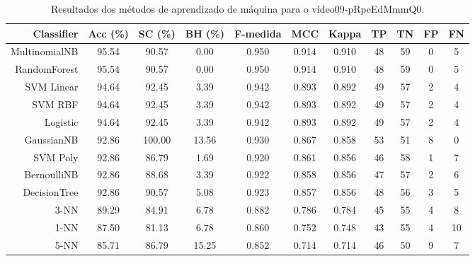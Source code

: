 \begin{table}[!htb]
\centering
\caption{Resultados dos métodos de aprendizado de máquina para o vídeo09-pRpeEdMmmQ0.}
\label{tab:09-pRpeEdMmmQ0}
\begin{tabular}{r|c|c|c|c|c|c|c|c|c|c}
\hline\hline
Classifier & Acc (\%) & SC (\%) & BH (\%) & F-medida & MCC & Kappa & TP & TN & FP & FN \\ \hline
MultinomialNB & 95.54 & 90.57 & 0.00 & 0.950 & 0.914 & 0.910 & 48 & 59 & 0 & 5 \\ 
RandomForest & 95.54 & 90.57 & 0.00 & 0.950 & 0.914 & 0.910 & 48 & 59 & 0 & 5 \\ 
SVM Linear & 94.64 & 92.45 & 3.39 & 0.942 & 0.893 & 0.892 & 49 & 57 & 2 & 4 \\ 
SVM RBF & 94.64 & 92.45 & 3.39 & 0.942 & 0.893 & 0.892 & 49 & 57 & 2 & 4 \\ 
Logistic & 94.64 & 92.45 & 3.39 & 0.942 & 0.893 & 0.892 & 49 & 57 & 2 & 4 \\ 
GaussianNB & 92.86 & 100.00 & 13.56 & 0.930 & 0.867 & 0.858 & 53 & 51 & 8 & 0 \\ 
SVM Poly & 92.86 & 86.79 & 1.69 & 0.920 & 0.861 & 0.856 & 46 & 58 & 1 & 7 \\ 
BernoulliNB & 92.86 & 88.68 & 3.39 & 0.922 & 0.858 & 0.856 & 47 & 57 & 2 & 6 \\ 
DecisionTree & 92.86 & 90.57 & 5.08 & 0.923 & 0.857 & 0.856 & 48 & 56 & 3 & 5 \\ 
3-NN & 89.29 & 84.91 & 6.78 & 0.882 & 0.786 & 0.784 & 45 & 55 & 4 & 8 \\ 
1-NN & 87.50 & 81.13 & 6.78 & 0.860 & 0.752 & 0.748 & 43 & 55 & 4 & 10 \\ 
5-NN & 85.71 & 86.79 & 15.25 & 0.852 & 0.714 & 0.714 & 46 & 50 & 9 & 7 \\ 
\hline\hline
\end{tabular}
\end{table}
